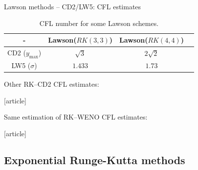 \documentclass{beamer}
\newcommand{\customcite}[1]{\cite{#1}}
\begin{document}
\begin{frame}{Lawson methods -- CD2/LW5: CFL estimates}
  \begin{table}
    \centering
    \begin{tabular}{|c|c|c|c|}
      \hline
      - & Lawson($RK(3,3)$) & Lawson($RK(4,4)$) \\
      \hline
      CD2 ($y_{\max}$) & $\sqrt{3}$ & $2\sqrt{2}$\\
      \hline
      LW5 ($\sigma$) & $1.433$   & $1.73$   \\
      \hline  
    \end{tabular}
    \caption{CFL number for some Lawson schemes.}
  \end{table}
  Other RK--CD2 CFL estimates:
\begin{thebibliography}{9}
  [article]
  \bibitem{} \customcite{Baldauf:2008}
\end{thebibliography}
  Same estimation of RK--WENO CFL estimates:
\begin{thebibliography}{9}
  [article]
  \bibitem{} \customcite{Motamed:2010}
  \bibitem{} \customcite{Lunet:2017}
\end{thebibliography}
\end{frame}

\subsection{Exponential Runge-Kutta methods}
\end{document}

